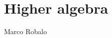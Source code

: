 \chapter*{Higher algebra}
\begin{flushright}
  Marco Robalo
\end{flushright}

\begin{refsection}
\printbibliography[heading = local]

\end{refsection}


